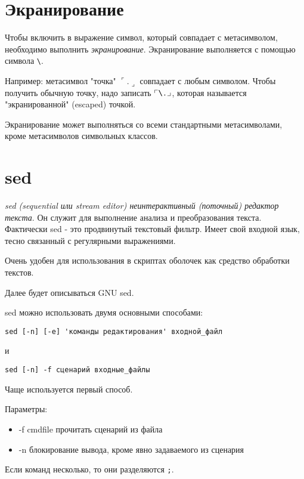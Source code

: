 \section{Экранирование}

Чтобы включить в выражение символ, который совпадает с метасимволом, необходимо выполнить \emph{экранирование}. Экранирование выполняется с помощью символа \verb+\+.

Например: метасимвол "точка" $\ulcorner . \lrcorner$ совпадает с любым символом. Чтобы получить обычную точку, надо записать $\ulcorner \verb+\.+ \lrcorner$, которая называется "экранированной" (escaped) точкой.

Экранирование может выполняться со всеми стандартными метасимволами, кроме метасимволов символьных классов.



\section{sed}

\emph{sed (sequential или stream editor)  неинтерактивный (поточный) редактор текста}. Он служит для выполнение анализа и преобразования текста. Фактически sed - это продвинутый текстовый фильтр. Имеет свой входной язык, тесно связанный с регулярными выражениями.

Очень удобен для использования в скриптах оболочек как средство обработки текстов.

Далее будет описываться GNU sed.

sed можно использовать двумя основными способами:
\begin{verbatim}
sed [-n] [-e] 'команды редактирования' входной_файл
\end{verbatim}
\begin{center}и\end{center}
\begin{verbatim}
sed [-n] -f сценарий входные_файлы
\end{verbatim}

Чаще используется первый способ.

Параметры:
\begin{itemize}
\item -f cmdfile  прочитать сценарий из файла
\item -n  блокирование вывода, кроме явно задаваемого из сценария 
\end{itemize}

Если команд несколько, то они разделяются \verb+;+.

